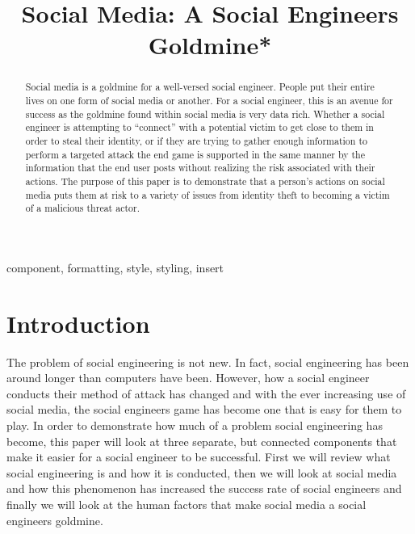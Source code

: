 \documentclass[conference]{IEEEtran}
\begin{document}
\title{Social Media: A Social Engineers Goldmine*\\
{\footnotesize \textsuperscript{}}
}

\author{

}
\maketitle

\begin{abstract}
Social media is a goldmine for a well-versed social engineer. People put their entire lives on one form of social media or another. For a social engineer, this is an avenue for success as the goldmine found within social media is very data rich.  Whether a social engineer is attempting to “connect” with a potential victim to get close to them in order to steal their identity, or if they are trying to gather enough information to perform a targeted attack the end game is supported in the same manner by the information that the end user posts without realizing the risk associated with their actions.  The purpose of this paper is to demonstrate that a person’s actions on social media puts them at risk to a variety of issues from identity theft to becoming a victim of a malicious threat actor.  
\end{abstract}

\begin{IEEEkeywords}
component, formatting, style, styling, insert
\end{IEEEkeywords}

\section{Introduction}
The problem of social engineering is not new.  In fact, social engineering has been around longer than computers have been.  However, how a social engineer conducts their method of attack has changed and with the ever increasing use of social media, the social engineers game has become one that is easy for them to play. In order to demonstrate how much of a problem social engineering has become, this paper will look at three separate, but connected components that make it easier for a social engineer to be successful. First we will review what social engineering is and how it is conducted, then we will look at social media and how this phenomenon has increased the success rate of social engineers and finally we will look at the human factors that make social media a social engineers goldmine.  
\end{document}

